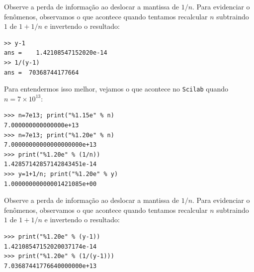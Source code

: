 \begin{ex}
\begin{verbatim}
\end{verbatim}
Observe a perda de informação ao deslocar a mantissa de $1/n$. Para evidenciar o fenômenos, observamos o que acontece quando tentamos recalcular $n$ subtraindo $1$ de $1+1/n$ e invertendo o resultado:
\begin{verbatim}
>> y-1
ans =    1.42108547152020e-14
>> 1/(y-1)
ans =  70368744177664
\end{verbatim}
\fi
\ifisscilab
Para entendermos isso melhor, vejamos o que acontece no \verb+Scilab+ quando $n=7\times 10^{13}$:
\begin{verbatim}
>>> n=7e13; print("%1.15e" % n)
7.000000000000000e+13
>>> n=7e13; print("%1.20e" % n)
7.00000000000000000000e+13
>>> print("%1.20e" % (1/n))
1.42857142857142843451e-14
>>> y=1+1/n; print("%1.20e" % y)
1.00000000000001421085e+00
\end{verbatim}
Observe a perda de informação ao deslocar a mantissa de $1/n$. Para evidenciar o fenômenos, observamos o que acontece quando tentamos recalcular $n$ subtraindo $1$ de $1+1/n$ e invertendo o resultado:
\begin{verbatim}
>>> print("%1.20e" % (y-1))
1.42108547152020037174e-14
>>> print("%1.20e" % (1/(y-1)))
7.03687441776640000000e+13
\end{verbatim}
\fi
\end{ex}

